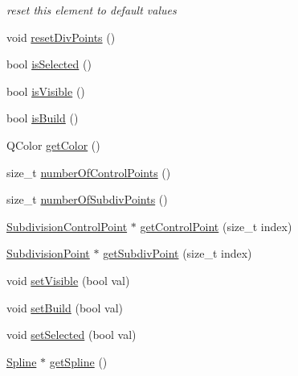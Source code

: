 \begin{DoxyCompactItemize}
\begin{DoxyCompactList}\small\item\em reset this element to default values \end{DoxyCompactList}\item 
void \hyperlink{classShipCADGeometry_1_1SubdivisionControlCurve_a34e280e9ba6e6705577d1afd229e9f20}{reset\-Div\-Points} ()
\item 
bool \hyperlink{classShipCADGeometry_1_1SubdivisionControlCurve_a8b3c57aba1c16b77b902daacd7b88d0c}{is\-Selected} ()
\item 
bool \hyperlink{classShipCADGeometry_1_1SubdivisionControlCurve_a36bcf74cf20d7f1ae888f25f774b040d}{is\-Visible} ()
\item 
bool \hyperlink{classShipCADGeometry_1_1SubdivisionControlCurve_a16750d28e492cadbb3dd0f1ad303512e}{is\-Build} ()
\item 
Q\-Color \hyperlink{classShipCADGeometry_1_1SubdivisionControlCurve_a1dd7d33fd574c3cfdd53ccbb13abb695}{get\-Color} ()
\item 
size\-\_\-t \hyperlink{classShipCADGeometry_1_1SubdivisionControlCurve_a28c99c59aa80008a27cec27e8aada56b}{number\-Of\-Control\-Points} ()
\item 
size\-\_\-t \hyperlink{classShipCADGeometry_1_1SubdivisionControlCurve_a98ca6b2a39a99d0cee63263df65c6c1e}{number\-Of\-Subdiv\-Points} ()
\item 
\hyperlink{classShipCADGeometry_1_1SubdivisionControlPoint}{Subdivision\-Control\-Point} $\ast$ \hyperlink{classShipCADGeometry_1_1SubdivisionControlCurve_a0331fade870dd4856c070e2f487882b5}{get\-Control\-Point} (size\-\_\-t index)
\item 
\hyperlink{classShipCADGeometry_1_1SubdivisionPoint}{Subdivision\-Point} $\ast$ \hyperlink{classShipCADGeometry_1_1SubdivisionControlCurve_a52b12b58d524baba317ab6504e80018f}{get\-Subdiv\-Point} (size\-\_\-t index)
\item 
void \hyperlink{classShipCADGeometry_1_1SubdivisionControlCurve_a585a51955a6e91642b01d474eeef0d4f}{set\-Visible} (bool val)
\item 
void \hyperlink{classShipCADGeometry_1_1SubdivisionControlCurve_a698e6153097398da8fe2c6ecf2f2408b}{set\-Build} (bool val)
\item 
void \hyperlink{classShipCADGeometry_1_1SubdivisionControlCurve_abaf7f7cfec21eedacf55b1654f3e7f2f}{set\-Selected} (bool val)
\item 
\hyperlink{classShipCADGeometry_1_1Spline}{Spline} $\ast$ \hyperlink{classShipCADGeometry_1_1SubdivisionControlCurve_a6c62247f84c62bded5c291c54623f0f6}{get\-Spline} ()

\end{DoxyCompactItemize}
